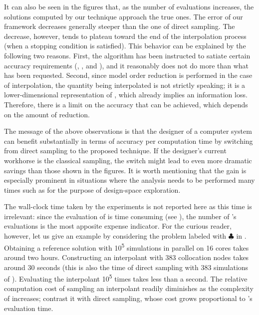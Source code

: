 It can also be seen in the figures that, as the number of evaluations increases,
the solutions computed by our technique approach the true ones. The error of our
framework decreases generally steeper than the one of direct sampling. The
decrease, however, tends to plateau toward the end of the interpolation process
(when a stopping condition is satisfied). This behavior can be explained by the
following two reasons. First, the algorithm has been instructed to satiate
certain accuracy requirements (, , and ), and it
reasonably does not do more than what has been requested. Second, since model
order reduction is performed in the case of interpolation, the quantity being
interpolated is not \g strictly speaking; it is a lower-dimensional
representation of \g, which already implies an information loss. Therefore,
there is a limit on the accuracy that can be achieved, which depends on the
amount of reduction.

The message of the above observations is that the designer of a computer system
can benefit substantially in terms of accuracy per computation time by switching
from direct sampling to the proposed technique. If the designer's current
workhorse is the classical  sampling, the switch might lead to even more
dramatic savings than those shown in the figures. It is worth mentioning that
the gain is especially prominent in situations where the analysis needs to be
performed many times such as for the purpose of design-space exploration.

\begin{remark}
The wall-clock time taken by the experiments is not reported here as this time
is irrelevant: since the evaluation of \g is time consuming (see
), the number of \g's evaluations is the most apposite
expense indicator. For the curious reader, however, let us give an example by
considering the problem labeled with $\clubsuit$ in
. Obtaining a reference solution with
10\textsuperscript{5} simulations in parallel on 16 cores takes around two
hours. Constructing an interpolant with 383 collocation nodes takes around 30
seconds (this is also the time of direct sampling with 383 simulations of \g).
Evaluating the interpolant 10\textsuperscript{5} times takes less than a second.
The relative computation cost of sampling an interpolant readily diminishes as
the complexity of \g increases; contrast it with direct sampling, whose cost
grows proportional to \g's evaluation time.
\end{remark}

